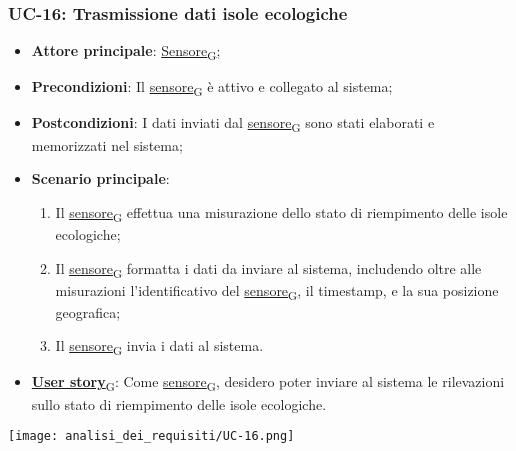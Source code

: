 \subsubsection{UC-16: Trasmissione dati isole ecologiche}
\begin{itemize}
	\item \textbf{Attore principale}: \href{https://7last.github.io/docs/rtb/documentazione-interna/glossario\#sensore}{Sensore\textsubscript{G}};
	\item \textbf{Precondizioni}: Il \href{https://7last.github.io/docs/rtb/documentazione-interna/glossario\#sensore}{sensore\textsubscript{G}} è attivo e collegato al sistema;
	\item \textbf{Postcondizioni}: I dati inviati dal \href{https://7last.github.io/docs/rtb/documentazione-interna/glossario\#sensore}{sensore\textsubscript{G}} sono stati elaborati e memorizzati nel sistema;
	\item \textbf{Scenario principale}:
	      \begin{enumerate}
		      \item Il \href{https://7last.github.io/docs/rtb/documentazione-interna/glossario\#sensore}{sensore\textsubscript{G}} effettua una misurazione dello stato di riempimento delle isole ecologiche;
		      \item Il \href{https://7last.github.io/docs/rtb/documentazione-interna/glossario\#sensore}{sensore\textsubscript{G}} formatta i dati da inviare al sistema, includendo oltre alle misurazioni l'identificativo del \href{https://7last.github.io/docs/rtb/documentazione-interna/glossario\#sensore}{sensore\textsubscript{G}},
		            il timestamp, e la sua posizione geografica;
		      \item Il \href{https://7last.github.io/docs/rtb/documentazione-interna/glossario\#sensore}{sensore\textsubscript{G}} invia i dati al sistema.
	      \end{enumerate}
	\item \href{https://7last.github.io/docs/rtb/documentazione-interna/glossario\#user-story}{\textbf{User story}\textsubscript{G}}: Come \href{https://7last.github.io/docs/rtb/documentazione-interna/glossario\#sensore}{sensore\textsubscript{G}}, desidero poter inviare al sistema le rilevazioni sullo stato di riempimento delle isole ecologiche.
\end{itemize}

\begin{center}
	\texttt{[image: analisi\_dei\_requisiti/UC-16.png]}
\end{center}

